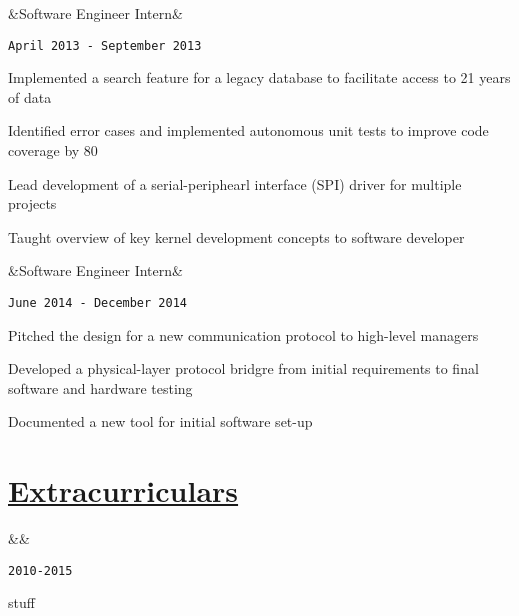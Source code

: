 \documentclass[11pt]{article}
\newcommand{\heading}[1]{
    \section*{\uline{\hfill #1}}
}
\newcommand{\squish}{
    \setlength{\itemsep}{0.5pt}
    \setlength{\parskip}{0pt}
    \setlength{\parsep}{0.5pt}
}
\newcommand{\when}[1]{
    \hfill \texttt{#1}
}
\newcommand{\experience}[3]{
    \ifx&#2&
        \item[{#1}]
    \else
        \item[{#1}, \emph{#2}]
    \fi
    \when{#3}
}
\begin{document}
\begin{description}
\squish
\experience{Garmin AT}
           {Software Engineer Intern}
           {April 2013 - September 2013}
 
	Implemented a search feature for a legacy database to facilitate access to 21 years of data

	Identified error cases and implemented autonomous unit tests to improve code coverage by 80%

	Lead development of a serial-periphearl interface (SPI) driver for multiple projects

	Taught overview of key kernel development concepts to software developer
 
\experience{Air-Weigh}
           {Software Engineer Intern}
           {June 2014 - December 2014}
 
	Pitched the design for a new communication protocol to high-level managers

	Developed a physical-layer protocol bridgre from initial requirements to final software and hardware testing

	Documented a new tool for initial software set-up
  
\end{description}

\heading{Extracurriculars}%

\begin{description}
\squish
\experience{Oregon State University}
           {}
           {2010-2015}

	stuff

\end{description}
\end{document}
